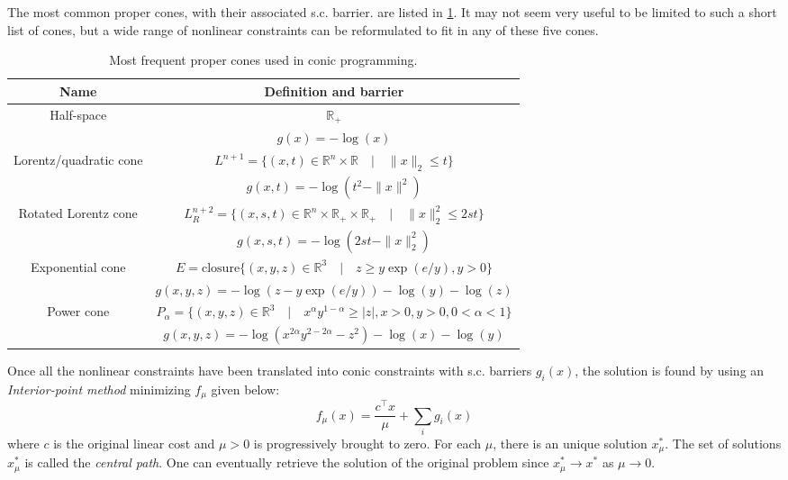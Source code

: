 \documentclass[11 pt]{report}
\begin{document}
The most common proper cones, with their associated s.c. barrier. are listed in \cref{tab:coefficients}. It may not seem very useful to be limited to such a short list of cones, but a wide range of nonlinear constraints can be reformulated to fit in any of these five cones.
\begin{table}
    \centering
    \begin{tabularx}{\textwidth}{@{\extracolsep{\stretch{1}}}*{2}{c}@{}}
        \toprule
        Name & Definition and barrier \\
        \midrule
        Half-space & $\mathbb{R}_+$\\[ 2pt]
         & $g(x) = -\log(x)$ \\[6 pt]
        Lorentz/quadratic cone & $L^{n+1} = \{(x, t) \in \mathbb{R}^n \times \mathbb{R} \quad \vert \quad \|x\|_2 \leq t\}$\\[2 pt]
         & $g(x, t) = -\log(t^2- \|x\|^2)$\\[6 pt]
        Rotated Lorentz cone & $L_R^{n+2} = \{(x, s, t) \in \mathbb{R}^n \times \mathbb{R}_+ \times \mathbb{R}_+ \quad\vert\quad \|x\|_2^2 \leq 2st\}$\\
         & $g(x, s, t) = -\log(2st - \|x\|_2^2)$\\[6 pt]
        Exponential cone & $E = \text{closure} \{(x, y, z) \in \mathbb{R}^3 \quad\vert\quad z \geq y \exp(e/y), y > 0\}$\\[2 pt]
         & $g(x, y, z) = -\log(z - y \exp(e/y)) - \log(y) - \log(z)$\\[6 pt]
        Power cone & $P_{\alpha} = \{(x, y, z) \in \mathbb{R}^3 \quad\vert\quad x^{\alpha} y^{1-\alpha} \geq |z|, x>0, y>0, 0<\alpha<1\}$\\[2 pt]
         & $g(x, y, z) = -\log(x^{2\alpha} y^{2-2\alpha} - z^2) - \log(x) - \log(y)$\\[2 pt]
        \bottomrule
    \end{tabularx}
    \caption{Most frequent proper cones used in conic programming.}
     \label{tab:coefficients}
\end{table}

Once all the nonlinear constraints have been translated into conic constraints with s.c. barriers $g_i(x)$, the solution is found by using an \textit{Interior-point method} minimizing $f_{\mu}$ given below:
\begin{equation}
    f_{\mu} (x) = \frac{c^\top x}{\mu} + \sum_{i} g_i(x)
\end{equation}
where $c$ is the original linear cost and $\mu > 0$ is progressively brought to zero. For each $\mu$, there is an unique solution $x^*_{\mu}$. The set of solutions $x^*_{\mu}$ is called the \textit{central path}. One can eventually retrieve the solution of the original problem since $x^*_{\mu} \to x^*$ as $\mu \to 0$.
\end{document}
